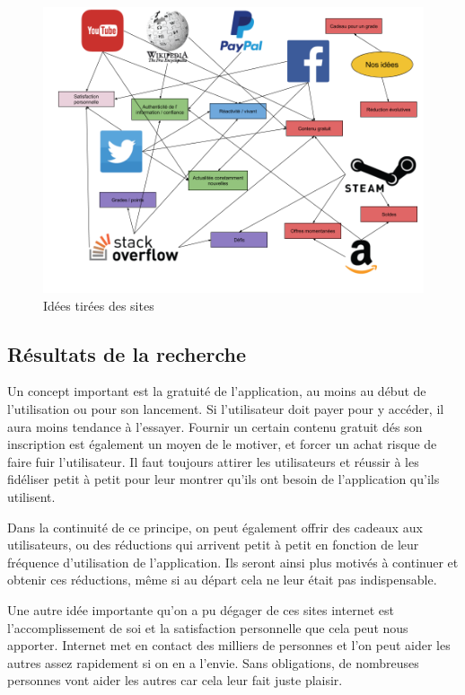 \documentclass[pidr]{tnreport}
\begin{document}
\begin{figure}[h]
  \centering
  \includegraphics[width=17cm]{figures/site_idea}
  \caption{Idées tirées des sites}
  \label{fig:site-idea}
\end{figure}

\subsection{Résultats de la recherche}

Un concept important est la gratuité de l’application, au moins au début de l’utilisation ou pour son lancement. Si l’utilisateur doit payer pour y accéder, il aura moins tendance à l’essayer. Fournir un certain contenu gratuit dés son inscription est également un moyen de le motiver, et forcer un achat risque de faire fuir l’utilisateur. Il faut toujours attirer les utilisateurs et réussir à les fidéliser petit à petit pour leur montrer qu’ils ont besoin de l’application qu’ils utilisent.

Dans la continuité de ce principe, on peut également offrir des cadeaux aux utilisateurs, ou des réductions qui arrivent petit à petit en fonction de leur fréquence d’utilisation de l’application. Ils seront ainsi plus motivés à continuer et obtenir ces réductions, même si au départ cela ne leur était pas indispensable.

Une autre idée importante qu’on a pu dégager de ces sites internet est l’accomplissement de soi et la satisfaction personnelle que cela peut nous apporter. Internet met en contact des milliers de personnes et l’on peut aider les autres assez rapidement si on en a l’envie. Sans obligations, de nombreuses personnes vont aider les autres car cela leur fait juste plaisir.
\end{document}

